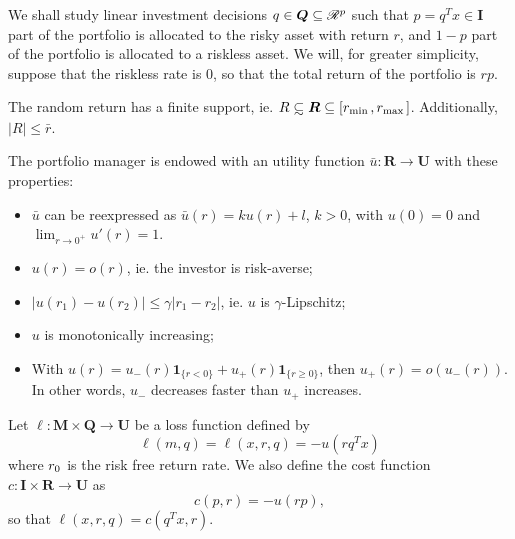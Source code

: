 \documentclass{article}
\begin{document}

We shall study linear investment decisions $q\in\bm Q\subseteq\mathscr{R}^p$ such that
$p=q^Tx\in\bm I$ part of the portfolio is allocated to the risky asset with return $r$,
and $1-p$ part of the portfolio is allocated to a riskless asset. We will, for greater
simplicity, suppose that the riskless rate is $0$, so that the total return of the
portfolio is $rp$. 



\begin{assumption}
  The random return has a finite support, ie.
  $R\subsetsim \bm R \subseteq [r_{\min{}},r_{\max{}}]$. Additionally, $|R|\leq \bar r$.
\end{assumption}

\begin{assumption}
  The portfolio manager is endowed with an utility function $\bar u:\bm R\to \bm U$ with
  these properties:
  \begin{itemize}
  \item $\bar u$ can be reexpressed as $\bar u(r) = ku(r) + l$, $k>0$, with $u(0) = 0$ and
    $\lim_{r\to0^+}u'(r) = 1$.
  \item $u(r) = o(r)$, ie. the investor is risk-averse;
  \item $|u(r_1) - u(r_2)| \leq \gamma|r_1-r_2|$, ie. $u$ is $\gamma$-Lipschitz;
  \item $u$ is monotonically increasing;
  \item With $u(r) = u_-(r)\bm1_{\{r<0\}}+u_+(r)\bm 1_{\{r\geq0\}}$, then $u_+(r) =
    o(u_-(r))$. In other words, $u_-$ decreases faster than $u_+$ increases. 
  \end{itemize}
\end{assumption}

\begin{deff}
  Let $\ell:\bm M\times \bm Q\to\bm U$ be a loss function defined by
  \[
    \ell(m,q) = \ell(x,r,q) = -u(rq^Tx)
  \]
  where $r_0$ is the risk free return rate. We also define the cost function
  $c:\bm I\times\bm R\to\bm U$ as
  \[
    c(p,r) = -u(rp),
  \]
  so that $\ell(x,r,q) = c(q^Tx,r)$. 
\end{deff}
\end{document}
